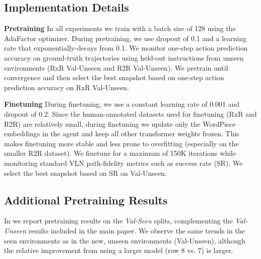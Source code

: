 \subsection{Implementation Details}

\textbf{Pretraining}\quad
In all experiments we train with a batch size of 128 using the AdaFactor optimizer. During pretraining, we use dropout of 0.1 and a learning rate that exponentially-decays from 0.1. We monitor one-step action prediction accuracy on ground-truth trajectories using held-out instructions from unseen environments (RxR Val-Unseen and R2R Val-Unseen). We pretrain until convergence and then select the best snapshot based on one-step action prediction accuracy on RxR Val-Unseen.

\textbf{Finetuning}\quad
During finetuning, we use a constant learning rate of 0.001 and dropout of 0.2. Since the human-annotated datasets used for finetuning (RxR and R2R) are relatively small, during finetuning we update only the WordPiece embeddings in the agent and keep all other transformer weights frozen. This makes finetuning more stable and less prone to overfitting (especially on the smaller R2R dataset). We finetune for a maximum of 150K iterations while monitoring standard VLN path-fidelity metrics such as success rate (SR). We select the best snapshot based on SR on Val-Unseen.

\subsection{Additional Pretraining Results}

In  we report pretraining results on the \textit{Val-Seen} splits, complementing the \textit{Val-Unseen} results included in the main paper. We observe the same trends in the seen environments as in the new, unseen environments (Val-Unseen), although the relative improvement from using a larger model (row 8 vs. 7) is larger.


